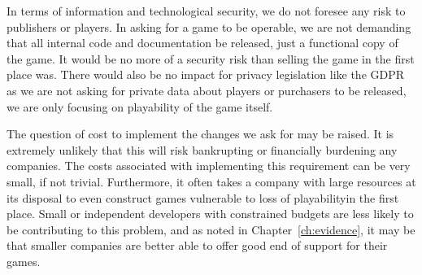 In terms of information and technological security, we do not foresee any risk to publishers or players.
In asking for a game to be operable, we are not demanding that all internal code and documentation be released, just a functional copy of the game.
It would be no more of a security risk than selling the game in the first place was.
There would also be no impact for privacy legislation like the GDPR as we are not asking for private data about players or purchasers to be released,
we are only focusing on playability of the game itself.

The question of cost to implement the changes we ask for may be raised.
It is extremely unlikely that this will risk bankrupting or financially burdening any companies.
The costs associated with implementing this requirement can be very small, if not trivial\cn.
Furthermore, it often takes a company with large resources at its disposal to even construct games vulnerable to loss of playability\cn in the first place.
Small or independent developers with constrained budgets are less likely to be contributing to this problem,
and as noted in Chapter~\ref{ch:evidence}, it may be that smaller companies are better able to offer good end of support for their games.
